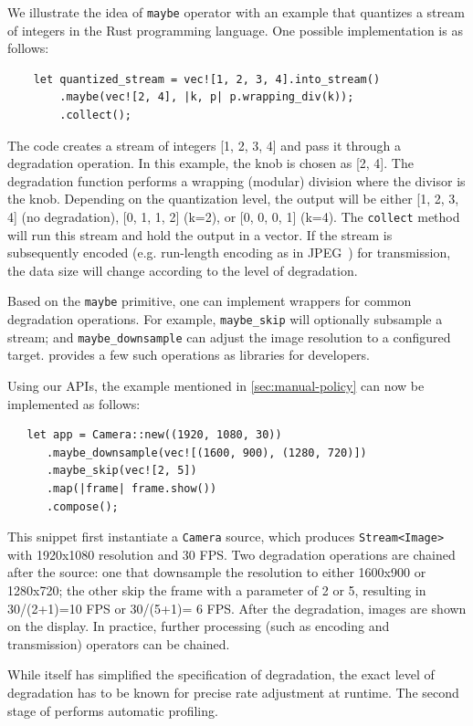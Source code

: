 We illustrate the idea of \texttt{maybe} operator with an example that quantizes
a stream of integers in the Rust programming language. One possible
implementation is as follows:

\begin{lstlisting}
    let quantized_stream = vec![1, 2, 3, 4].into_stream()
        .maybe(vec![2, 4], |k, p| p.wrapping_div(k));
        .collect();
\end{lstlisting}

The code creates a stream of integers [1, 2, 3, 4] and pass it through a
degradation operation. In this example, the knob is chosen as [2, 4]. The
degradation function performs a wrapping (modular) division where the divisor is
the knob. Depending on the quantization level, the output will be either [1, 2,
3, 4] (no degradation), [0, 1, 1, 2] (k=2), or [0, 0, 0, 1] (k=4). The
\texttt{collect} method will run this stream and hold the output in a vector.
If the stream is subsequently encoded (e.g. run-length encoding as in
JPEG~\cite{wallace1992jpeg}) for transmission, the data size will change
according to the level of degradation.

Based on the \texttt{maybe} primitive, one can implement wrappers for common
degradation operations. For example, \texttt{maybe\_skip} will optionally
subsample a stream; and \texttt{maybe\_downsample} can adjust the image
resolution to a configured target. \sysname{} provides a few such operations as
libraries for developers.

Using our APIs, the example mentioned in \autoref{sec:manual-policy} can now be
implemented as follows:

\begin{lstlisting}
   let app = Camera::new((1920, 1080, 30))
      .maybe_downsample(vec![(1600, 900), (1280, 720)])
      .maybe_skip(vec![2, 5])
      .map(|frame| frame.show())
      .compose();
\end{lstlisting}

This snippet first instantiate a \texttt{Camera} source, which produces
\texttt{Stream<Image>} with 1920x1080 resolution and 30 FPS. Two degradation
operations are chained after the source: one that downsample the resolution to
either 1600x900 or 1280x720; the other skip the frame with a parameter of 2 or
5, resulting in 30/(2+1)=10 FPS or 30/(5+1)= 6 FPS. After the degradation,
images are shown on the display. In practice, further processing (such as
encoding and transmission) operators can be chained.

While \maybe{} itself has simplified the specification of degradation, the exact
level of degradation has to be known for precise rate adjustment at runtime. The
second stage of \sysname{} performs automatic profiling.

